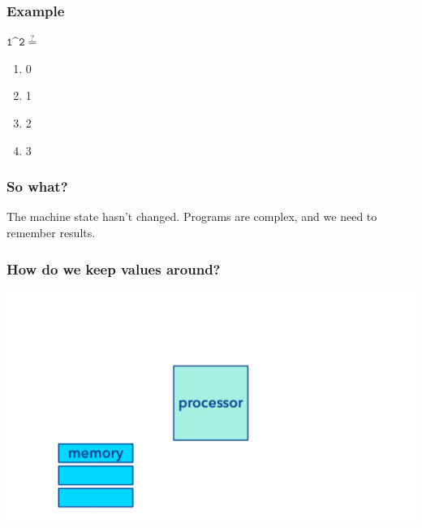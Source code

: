 \documentclass[11pt]{beamer}
\begin{document}
\begin{frame}
  \frametitle{Example}
  \Enlarge

  $\mathtt{1 \^{} 2} \overset{?}{=}$
  \begin{enumerate}[label=\Alph*]
  \item  0
  \item  1
  \item  2
  \item  3
  \end{enumerate}
\end{frame}


\begin{frame}
  \frametitle{So what?}
  \Enlarge

  \begin{itemize}
  \myitem  The machine state hasn't changed.
  \myitem  Programs are complex, and we need to remember results.
  \end{itemize}
\end{frame}

\begin{frame}
  \frametitle{How do we keep values around?}
  \includegraphics[width=\textwidth]{./img/computer-memory.png}
\end{frame}
\end{document}
